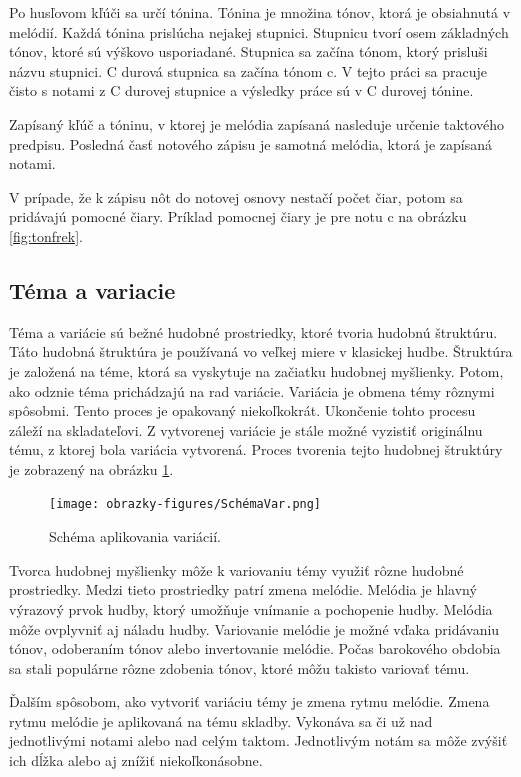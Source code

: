 Po husľovom kľúči sa určí tónina. Tónina je množina tónov, ktorá je obsiahnutá v melódií. Každá tónina prislúcha nejakej stupnici. Stupnicu tvorí osem základných tónov, ktoré sú výškovo usporiadané. Stupnica sa začína tónom, ktorý prisluši názvu stupnici. C durová stupnica sa začína tónom c. V tejto práci sa pracuje čisto s notami z C durovej stupnice a výsledky práce sú v C durovej tónine.

Zapísaný kľúč a tóninu, v ktorej je melódia zapísaná nasleduje určenie taktového predpisu. Posledná časť notového zápisu je samotná melódia, ktorá je zapísaná notami.

V prípade, že k zápisu nôt do notovej osnovy nestačí počet čiar, potom sa pridávajú pomocné čiary. Príklad pomocnej čiary je pre notu c na obrázku \ref{fig:tonfrek}.

\subsection{Téma a variacie}
Téma a variácie sú bežné hudobné prostriedky, ktoré tvoria hudobnú štruktúru. Táto hudobná štruktúra je používaná vo veľkej miere v klasickej hudbe. Štruktúra je založená na téme, ktorá sa vyskytuje na začiatku hudobnej myšlienky. Potom, ako odznie téma prichádzajú na rad variácie. Variácia je obmena témy rôznymi spôsobmi. Tento proces je opakovaný niekoľkokrát. Ukončenie tohto procesu záleží na skladateľovi. Z vytvorenej variácie je stále možné vyzistiť originálnu tému, z ktorej bola variácia vytvorená. Proces tvorenia tejto hudobnej štruktúry je zobrazený na obrázku \ref{fig:Schemvar}.

\begin{figure}[H]
\centering
\texttt{[image: obrazky-figures/SchémaVar.png]}
\caption{Schéma aplikovania variácií.}
\label{fig:Schemvar}
\end{figure}

Tvorca hudobnej myšlienky môže k variovaniu témy využiť rôzne hudobné prostriedky. Medzi tieto prostriedky patrí zmena melódie. Melódia je hlavný výrazový prvok hudby, ktorý umožňuje vnímanie a pochopenie hudby. Melódia môže ovplyvniť aj náladu hudby. Variovanie melódie je možné vďaka pridávaniu tónov, odoberaním tónov alebo invertovanie melódie. Počas barokového obdobia sa stali populárne rôzne zdobenia tónov, ktoré môžu takisto variovať tému.

Ďalším spôsobom, ako vytvoriť variáciu témy je zmena rytmu melódie. Zmena rytmu melódie je aplikovaná na tému skladby. Vykonáva sa či už nad jednotlivými notami alebo nad celým taktom. Jednotlivým notám sa môže zvýšiť ich dĺžka alebo aj znížiť niekoľkonásobne. 

